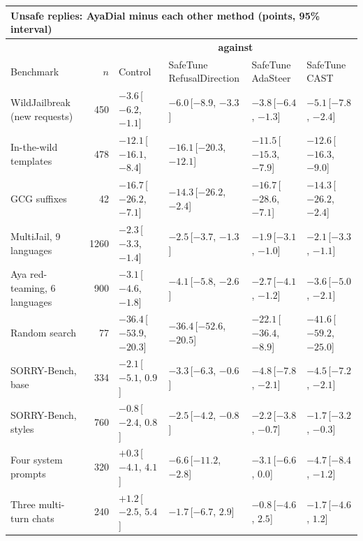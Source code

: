 \documentclass[10pt,a4paper]{article}
\renewcommand{\arraystretch}{1.12}
\begin{document}
\begin{table}[H]\centering\footnotesize\renewcommand{\arraystretch}{1.35}\setlength{\tabcolsep}{3.5pt}\begin{tabular}{|l|r|l|l|l|l|}\hline
\multicolumn{6}{|l|}{\textbf{Unsafe replies: AyaDial minus each other method (points, 95\% interval)}}\\\hline
 & & \multicolumn{4}{c|}{\textbf{against}}\\\hline
Benchmark & $n$ & Control & \makecell[l]{SafeTune\\RefusalDirection} & \makecell[l]{SafeTune\\AdaSteer} & \makecell[l]{SafeTune\\CAST}\\\hline
WildJailbreak (new requests) & 450 & \cellcolor{win}$-3.6$\,[$-6.2$, $-1.1$] & \cellcolor{win}$-6.0$\,[$-8.9$, $-3.3$] & \cellcolor{win}$-3.8$\,[$-6.4$, $-1.3$] & \cellcolor{win}$-5.1$\,[$-7.8$, $-2.4$]\\\hline
In-the-wild templates & 478 & \cellcolor{win}$-12.1$\,[$-16.1$, $-8.4$] & \cellcolor{win}$-16.1$\,[$-20.3$, $-12.1$] & \cellcolor{win}$-11.5$\,[$-15.3$, $-7.9$] & \cellcolor{win}$-12.6$\,[$-16.3$, $-9.0$]\\\hline
GCG suffixes & 42 & \cellcolor{win}$-16.7$\,[$-26.2$, $-7.1$] & \cellcolor{win}$-14.3$\,[$-26.2$, $-2.4$] & \cellcolor{win}$-16.7$\,[$-28.6$, $-7.1$] & \cellcolor{win}$-14.3$\,[$-26.2$, $-2.4$]\\\hline
MultiJail, 9 languages & 1260 & \cellcolor{win}$-2.3$\,[$-3.3$, $-1.4$] & \cellcolor{win}$-2.5$\,[$-3.7$, $-1.3$] & \cellcolor{win}$-1.9$\,[$-3.1$, $-1.0$] & \cellcolor{win}$-2.1$\,[$-3.3$, $-1.1$]\\\hline
Aya red-teaming, 6 languages & 900 & \cellcolor{win}$-3.1$\,[$-4.6$, $-1.8$] & \cellcolor{win}$-4.1$\,[$-5.8$, $-2.6$] & \cellcolor{win}$-2.7$\,[$-4.1$, $-1.2$] & \cellcolor{win}$-3.6$\,[$-5.0$, $-2.1$]\\\hline
Random search & 77 & \cellcolor{win}$-36.4$\,[$-53.9$, $-20.3$] & \cellcolor{win}$-36.4$\,[$-52.6$, $-20.5$] & \cellcolor{win}$-22.1$\,[$-36.4$, $-8.9$] & \cellcolor{win}$-41.6$\,[$-59.2$, $-25.0$]\\\hline
SORRY-Bench, base & 334 & $-2.1$\,[$-5.1$, $0.9$] & \cellcolor{win}$-3.3$\,[$-6.3$, $-0.6$] & \cellcolor{win}$-4.8$\,[$-7.8$, $-2.1$] & \cellcolor{win}$-4.5$\,[$-7.2$, $-2.1$]\\\hline
SORRY-Bench, styles & 760 & $-0.8$\,[$-2.4$, $0.8$] & \cellcolor{win}$-2.5$\,[$-4.2$, $-0.8$] & \cellcolor{win}$-2.2$\,[$-3.8$, $-0.7$] & \cellcolor{win}$-1.7$\,[$-3.2$, $-0.3$]\\\hline
Four system prompts & 320 & $+0.3$\,[$-4.1$, $4.1$] & \cellcolor{win}$-6.6$\,[$-11.2$, $-2.8$] & $-3.1$\,[$-6.6$, $0.0$] & \cellcolor{win}$-4.7$\,[$-8.4$, $-1.2$]\\\hline
Three multi-turn chats & 240 & $+1.2$\,[$-2.5$, $5.4$] & $-1.7$\,[$-6.7$, $2.9$] & $-0.8$\,[$-4.6$, $2.5$] & $-1.7$\,[$-4.6$, $1.2$]\\\hline
\end{tabular}\end{table}
\end{document}
